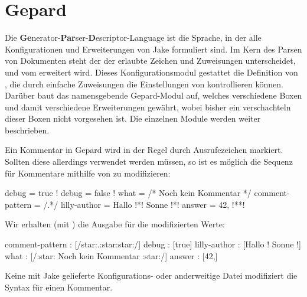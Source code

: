\section{Gepard}
Die \textbf{Ge}nerator-\textbf{Par}ser-\textbf{D}escriptor-Language ist die Sprache, in der alle Konfigurationen und Erweiterungen von Jake formuliert sind. Im Kern des Parsen von Dokumenten steht der  der erlaubte Zeichen und Zuweisungen unterscheidet, und vom  erweitert wird. Dieses Konfigurationsmodul gestattet die Definition von , die durch einfache Zuweisungen die Einstellungen von \Jake kontrollieren können. Darüber baut das namensgebende Gepard-Modul auf, welches verschiedene Boxen und damit verschiedene Erweiterungen gewährt, wobei bisher ein verschachteln dieser Boxen nicht vorgesehen ist. Die einzelnen Module werden weiter  beschrieben.
\begin{bemerkung}[Kommentare]
    Ein Kommentar in Gepard wird in der Regel durch Ausrufezeichen markiert. Sollten diese allerdings verwendet werden müssen, so ist es möglich die Sequenz für Kommentare mithilfe von  zu modifizieren:
\begin{gepard}
debug   = true
! debug = false !
what    = /* Noch kein Kommentar */
comment-pattern = /\*.*\*/
lilly-author    = Hallo !*! Sonne !*!
answer  = 42, !**!
\end{gepard}
Wir erhalten (mit ) die Ausgabe für die modifizierten Werte:
\begin{bash*}
comment-pattern     :  [/\:star:.:star:\:star:/]
debug               :  [true]
lilly-author        :  [Hallo ! Sonne !]
what                :  [/:star: Noch kein Kommentar :star:/]
answer              :  [42,]
\end{bash*}
Keine mit Jake gelieferte Konfigurations- oder anderweitige Datei modifiziert die Syntax für einen Kommentar.
\end{bemerkung}

